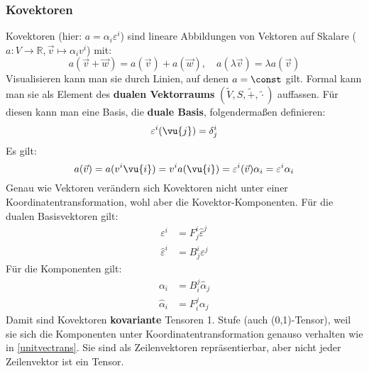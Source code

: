 	\subsubsection{Kovektoren}
	Kovektoren (hier: $a=\alpha_i\varepsilon^i$) sind lineare Abbildungen von Vektoren auf Skalare ($a:V\to\mathbb{R}, \vec{v}\mapsto \alpha_i v^i$) mit:
	\begin{equation}
		a(\vec{v}+\vec{w}) = a(\vec{v})+a(\vec{w}),\quad a(\lambda\vec{v}) = \lambda a(\vec{v})
	\end{equation}
	Visualisieren kann man sie durch Linien, auf denen $a=\const$ gilt. Formal kann man sie als Element des \textbf{dualen Vektorraums} $(\tilde{V},S,\tilde{+},\tilde{\cdot})$ auffassen. Für diesen kann man eine Basis, die \textbf{duale Basis}, folgendermaßen definieren:
	\begin{equation}
		\varepsilon^i(\vu{j}) = \delta_{j}^i
	\end{equation}
	Es gilt:
	\begin{equation}
		a (\vec{v})=a(v^i\vu{i})=v^i a(\vu{i})=\varepsilon^i(\vec{v}) \alpha_i=\varepsilon^i \alpha_i
	\end{equation}
	Genau wie Vektoren verändern sich Kovektoren nicht unter einer Koordinatentransformation, wohl aber die Kovektor-Komponenten. Für die dualen Basisvektoren gilt:
	\begin{equation}\begin{split}
			\varepsilon^i &=  F_j^i\hat{\varepsilon}^j\\
			\hat{\varepsilon}^i &= B_{j}^i \varepsilon^j
	\end{split}\end{equation}
	Für die Komponenten gilt:
	\begin{equation}\begin{split}
			\alpha_i &=  B_{i}^j\hat{\alpha}_j\\
			\hat{\alpha}_i &= F_{i}^j \alpha_j
	\end{split}\end{equation}
	Damit sind Kovektoren \textbf{kovariante} Tensoren 1. Stufe (auch (0,1)-Tensor), weil sie sich die Komponenten unter Koordinatentransformation genauso verhalten wie in \ref{unitvectrans}. Sie sind als Zeilenvektoren repräsentierbar, aber nicht jeder Zeilenvektor ist ein Tensor.

